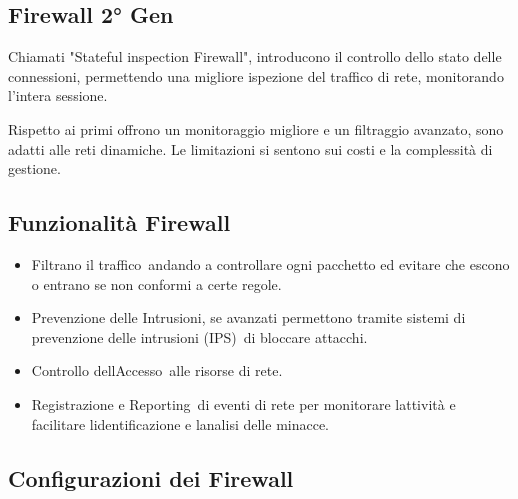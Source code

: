 \documentclass[
]{article}
\providecommand{\tightlist}{%
  \setlength{\itemsep}{0pt}\setlength{\parskip}{0pt}}
\begin{document}
\subsection{\texorpdfstring{{Firewall 2°
Gen}}{Firewall 2° Gen}}\label{h.cc4fwhvscxbm}

{Chiamati "Stateful inspection Firewall", introducono il controllo dello
stato delle connessioni, permettendo una migliore ispezione del traffico
di rete, monitorando l'intera sessione. }

{}

{Rispetto ai primi offrono un }{monitoraggio migliore }{e un
}{filtraggio avanzato}{, sono }{adatti alle reti dinamiche}{. Le
}{limitazioni }{si sentono sui }{costi }{e la }{complessità }{di
gestione.}

\subsection{\texorpdfstring{{Funzionalità
Firewall}}{Funzionalità Firewall}}\label{h.omxoef6mt0o0}

\begin{itemize}
\tightlist
\item
  {Filtrano il traffico}{~andando a controllare ogni pacchetto ed
  evitare che escono o entrano se non conformi a certe regole.}
\end{itemize}

{}

\begin{itemize}
\tightlist
\item
  {Prevenzione delle Intrusioni}{, se avanzati permettono tramite
  }{sistemi di prevenzione delle intrusioni (IPS)}{~di bloccare
  attacchi.}
\end{itemize}

{}

\begin{itemize}
\tightlist
\item
  {Controllo dell\textquotesingle Accesso}{~alle risorse di rete.}
\end{itemize}

{}

\begin{itemize}
\tightlist
\item
  {Registrazione e Reporting}{~di eventi di rete per monitorare
  l\textquotesingle attività e facilitare
  l\textquotesingle identificazione e l\textquotesingle analisi delle
  minacce.}
\end{itemize}

\subsection{\texorpdfstring{{Configurazioni dei
Firewall}}{Configurazioni dei Firewall}}\label{h.flkh5mnagoyj}
\end{document}
